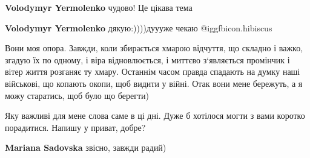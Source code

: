\begin{itemize}
\begin{itemize}
\textbf{Volodymyr Yermolenko} чудово! Це цікава тема

\textbf{Volodymyr Yermolenko} дякую:))))дуууже чекаю @igg{fbicon.hibiscus} 
\end{itemize} %


Вони моя опора. Завжди, коли збирається хмарою відчуття, що складно і важко,
згадую їх по одному, і віра відновлюється, і миттєво з‘являється промінчик і
вітер життя розганяє ту хмару. Останнім часом правда спадають на думку наші
військові, що копають окопи, щоб видити у війні. Отак вони мене бережуть, а я
можу старатись, щоб було що берегти)


Яку важливі для мене слова саме в ці дні. Дуже б хотілося могти з вами коротко
порадитися. Напишу у приват, добре?

\begin{itemize} %
\textbf{Mariana Sadovska} звісно, завжди радий)
\end{itemize} %

\end{itemize} %

